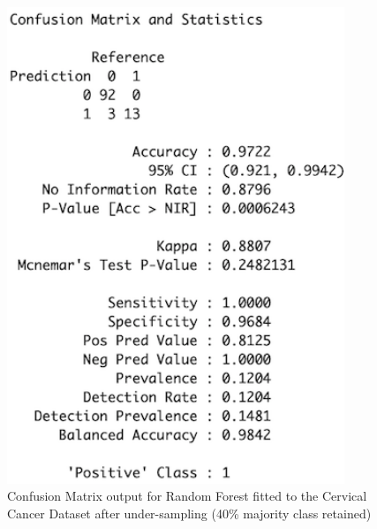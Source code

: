 \begin{figure}[!htbp]
    \centering
    \begin{minipage}{0.45\textwidth}
        \centering
        \includegraphics[width=0.9\textwidth]{ThesisTemplate/appendix/images/Chapter5Appendix/ConfusionMatrix40/CervicalCancer.png}
        \caption{Confusion Matrix output for Random Forest fitted to the Cervical Cancer Dataset after under-sampling (40\% majority class retained)}
        \label{fig:matrixCC40}
    \end{minipage}\hfill
    \begin{minipage}{0.45\textwidth}
        \centering

\end{minipage}
\end{figure}
